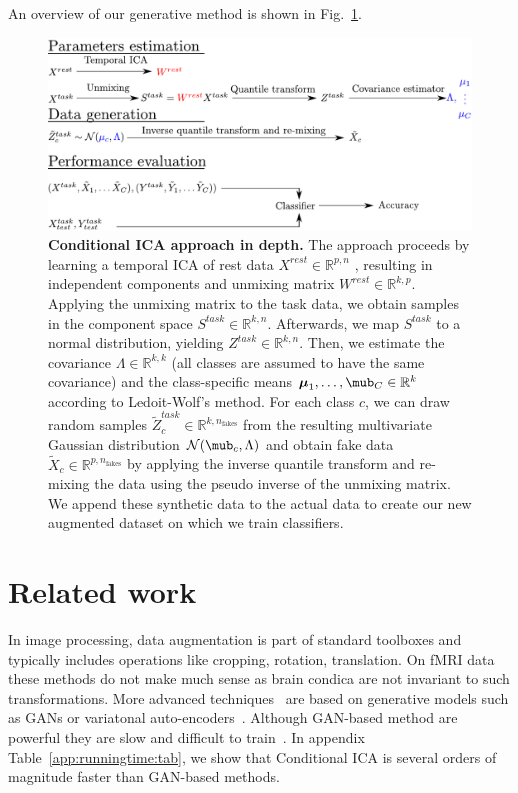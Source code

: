 An overview of our generative method is shown in Fig.~\ref{Fig11}.
%
\begin{figure}
\centerline{\includegraphics[width=1\textwidth]{figures/condica/method_figure}}
\caption{\textbf{Conditional ICA approach in depth.} 
The approach proceeds by learning a temporal ICA of rest data $X^{rest} \in
\mathbb{R}^{p, n}$ , resulting in
independent components and unmixing matrix $W^{rest} \in \mathbb{R}^{k, p}$.
%
Applying the unmixing matrix to the task data, we obtain samples in the component
space $S^{task} \in \mathbb{R}^{k, n}$.
%
Afterwards, we map $S^{task}$ to a normal distribution, yielding $Z^{task} \in
\mathbb{R}^{k, n}$. 
%
Then, we estimate the covariance $\Lambda \in \mathbb{R}^{k, k}$ (all classes are assumed to have the
same covariance) and the class-specific means $\boldsymbol{\mu}_1, \dots, \mub_C \in \mathbb{R}^{k}$ according to Ledoit-Wolf's method.
%
For each class $c$, we can draw random samples $\tilde{Z}^{task}_c \in
\mathbb{R}^{k, n_{\mathrm{fakes}}}$ from the
resulting multivariate Gaussian distribution $\mathcal{N}(\mub_c, \Lambda)$ and
obtain fake data $\tilde{X}_c  \in
\mathbb{R}^{p, n_{\mathrm{fakes}}}$
by applying the inverse quantile transform and re-mixing the data using the pseudo inverse of the unmixing matrix.
%
We append these synthetic data to the actual data to create our new augmented
dataset on which we train classifiers.}
\label{Fig11}
\end{figure}
%

\section{Related work}
In image processing, data augmentation is part of standard toolboxes and
typically includes operations like cropping, rotation, translation.
%
On fMRI data these methods do not make much sense as brain condica are not invariant to such transformations.
%
More advanced techniques~\cite{zhuang2019fmri}%
are based on generative models such as GANs or variatonal
auto-encoders~\cite{kingma2013auto}. Although GAN-based method are powerful they are slow and difficult to train~\cite{arjovsky_wasserstein_2017}. In
appendix Table~\ref{app:runningtime:tab}, we show that Conditional ICA is several orders of magnitude faster than GAN-based methods.

